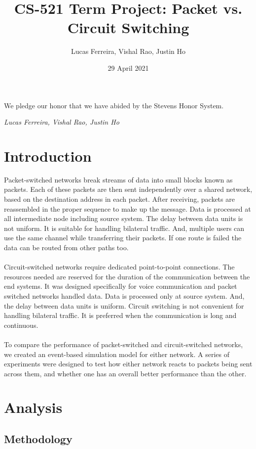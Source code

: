 \documentclass{article}
\title{CS-521 Term Project: Packet vs. Circuit Switching}
\author{Lucas Ferreira, Vishal Rao, Justin Ho}
\date{29 April 2021}
\begin{document}
  \maketitle

  {\flushleft We pledge our honor that we have abided by the Stevens Honor System.

  \textit{Lucas Ferreira, Vishal Rao, Justin Ho}}

  \section{Introduction}

  Packet-switched networks break streams of data into small blocks known as packets. Each of these packets are then sent
  independently over a shared network, based on the destination address in each packet. After receiving, packets are reassembled
  in the proper sequence to make up the message. Data is processed at all intermediate node including source system. The
  delay between data units is not uniform. It is suitable for handling bilateral traffic. And, multiple users can use the
  same channel while transferring their packets. If one route is failed the data can be routed from other paths too.\\\\
  Circuit-switched networks require dedicated point-to-point connections. The resources needed are reserved for the duration
  of the communication between the end systems. It was designed specifically for voice communication and packet switched
  networks handled data. Data is processed only at source system. And, the delay between data units is uniform. Circuit
  switching is not convenient for handling bilateral traffic. It is preferred when the communication is long and continuous.\\\\
  To compare the performance of packet-switched and circuit-switched networks, we created an event-based simulation model
  for either network. A series of experiments were designed to test how either network reacts to packets being sent across
  them, and whether one has an overall better performance than the other.


  \section{Analysis}

  \subsection{Methodology}
\end{document}
